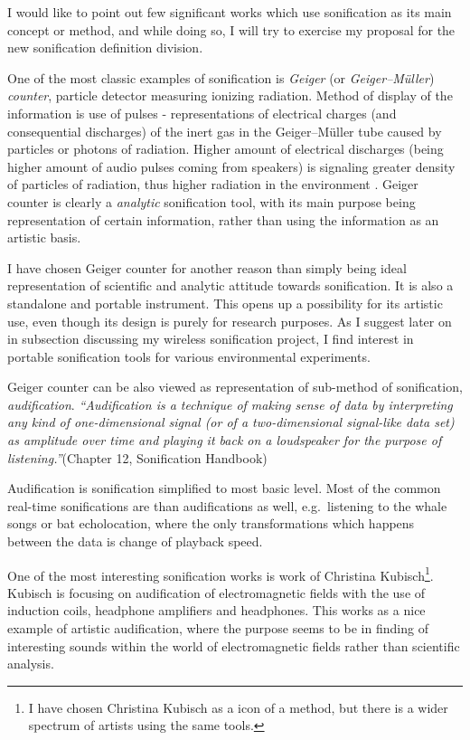 \documentclass[12pt,a4paper,oneside]{report}
\begin{document}


I would like to point out few significant works which use sonification as its main concept or method, and while doing so, I will try to exercise my proposal for the new sonification definition division.

One of the most classic examples of sonification is \emph{Geiger} (or \emph{Geiger–Müller}) \emph{counter}, particle detector measuring ionizing radiation. Method of display of the information is use of pulses - representations of electrical charges (and consequential discharges) of the inert gas in the Geiger–Müller tube caused by particles or photons of radiation. Higher amount of electrical discharges (being higher amount of audio pulses coming from speakers) is signaling greater density of particles of radiation, thus higher radiation in the environment \cite{Knoll2010}. Geiger counter is clearly a \emph{analytic} sonification tool, with its main purpose being representation of certain information, rather than using the information as an artistic basis.

I have chosen Geiger counter for another reason than simply being ideal representation of scientific and analytic attitude towards sonification. It is also a standalone and portable instrument. This opens up a possibility for its artistic use, even though its design is purely for research purposes. As I suggest later on in subsection discussing my wireless sonification project, I find interest in portable sonification tools for various environmental experiments.

Geiger counter can be also viewed as representation of sub-method of sonification, \emph{audification}. \emph{``Audification is a technique of making sense of data by interpreting any kind of one-dimensional signal (or of a two-dimensional signal-like data set) as amplitude over time and playing it back on a loudspeaker for the purpose of listening.''}(Chapter 12, Sonification Handbook) 

Audification is sonification simplified to most basic level. Most of the common real-time sonifications are than audifications as well, e.g.\ listening to the whale songs or bat echolocation, where the only transformations which happens between the data is change of playback speed.

One of the most interesting sonification works is work of Christina Kubisch\footnote{I have chosen Christina Kubisch as a icon of a method, but there is a wider spectrum of artists using the same tools.}. Kubisch is focusing on audification of electromagnetic fields with the use of induction coils, headphone amplifiers and headphones. This works as a nice example of artistic audification, where the purpose seems to be in finding of interesting sounds within the world of electromagnetic fields rather than scientific analysis. 
\end{document}
